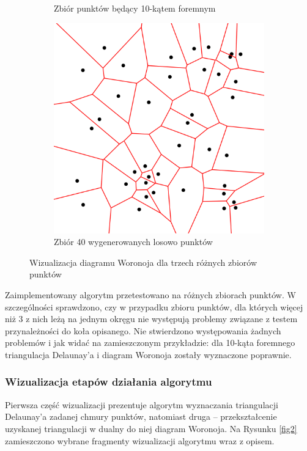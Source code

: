 \documentclass{myclass}
\begin{document}
\begin{figure}[ht]
\begin{subfigure}[b]{0.3\textwidth}
        \caption{Zbiór punktów będący 10-kątem foremnym}
    \end{subfigure}
    \hfill
    \begin{subfigure}[b]{0.3\textwidth}
        \centering
        \includegraphics[width=\textwidth]{figs/voronoi3.png}
        \caption{Zbiór 40 wygenerowanych losowo punktów}
    \end{subfigure}

    \caption{Wizualizacja diagramu Woronoja dla trzech różnych zbiorów punktów}
    \label{fig1}
\end{figure}

Zaimplementowany algorytm przetestowano na różnych zbiorach punktów. W
szczególności sprawdzono, czy w przypadku zbioru punktów, dla których więcej niż
3 z nich leżą na jednym okręgu nie występują problemy związane z testem
przynależności do koła opisanego. Nie stwierdzono występowania żadnych problemów
i jak widać na zamieszczonym przykładzie: dla 10-kąta foremnego triangulacja
Delaunay'a i diagram Woronoja zostały wyznaczone poprawnie.

\subsubsection{Wizualizacja etapów działania algorytmu}

Pierwsza część wizualizacji prezentuje
algorytm wyznaczania triangulacji Delaunay'a zadanej chmury punktów, natomiast
druga -- przekształcenie uzyskanej triangulacji w dualny do niej diagram
Woronoja. Na Rysunku \ref{fig2} zamieszczono wybrane fragmenty wizualizacji
algorytmu wraz z opisem.
\end{document}
